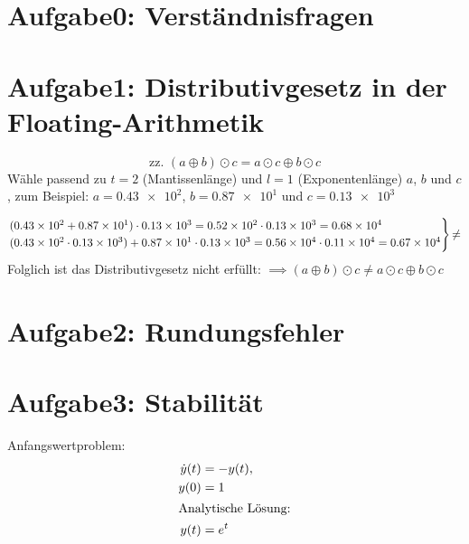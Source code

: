 



\maketitle

\section*{Aufgabe0: Verständnisfragen}

\section*{Aufgabe1: Distributivgesetz in der Floating-Arithmetik}
\begin{equation*}
  \text{zz. }(a \oplus b) \odot c = a \odot c \oplus b \odot c
\end{equation*}
\noindent
Wähle passend zu $t=2$ (Mantissenlänge) und $l=1$ (Exponentenlänge) $a$, $b$ und $c$,
zum Beispiel: $a=\num{0,43e2}$, $b=\num{0,87e1}$ und $c=\num{0,13e3}$

\begin{align*}
\begin{rcases}
  (\num{0,43e2} + \num{0,87e1}) \cdot \num{0,13e3}
  = \num{0,52e2} \cdot \num{0,13e3}
  = \num{0,68e4} \\
  (\num{0,43e2} \cdot \num{0,13e3}) + \num{0,87e1} \cdot \num{0,13e3}
  = \num{0,56e4} \cdot \num{0,11e4}
  = \num{0,67e4}
\end{rcases}
{\ne}
\end{align*}
\noindent
Folglich ist das Distributivgesetz  nicht erfüllt:
$\implies (a \oplus b) \odot c \ne a \odot c \oplus b \odot c$
\section*{Aufgabe2: Rundungsfehler}

\section*{Aufgabe3: Stabilität}
Anfangswertproblem:
\begin{align*}
  \dot{y}(t)&=-y(t), \\ y(0)&=1 \\
  \intertext{Analytische Lösung:} y(t)&=e^{t}
\end{align*}

